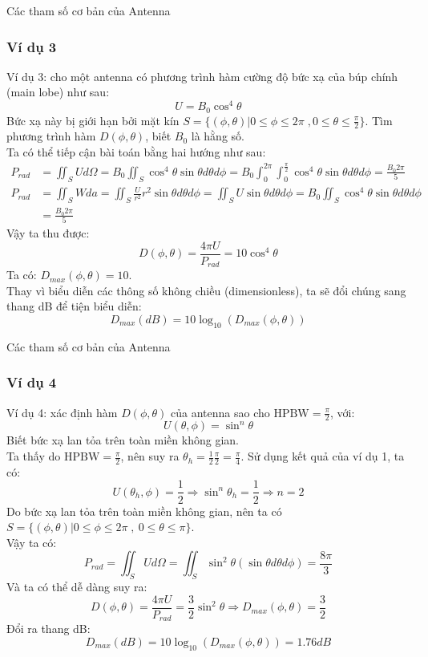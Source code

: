 \documentclass[8pt]{beamer}
\begin{document}
\begin{frame}{Các tham số cơ bản của Antenna}
\subsubsection{Ví dụ 3}
Ví dụ 3: cho một antenna có phương trình hàm cường độ bức xạ của búp chính (main lobe) như sau:
$$U=B_{0}\cos^4{\theta}$$
Bức xạ này bị giới hạn bởi mặt kín $S=\{(\phi,\theta)|0\leq\phi\leq 2\pi\; ,0\leq\theta\leq\frac{\pi}{2}\}$. Tìm phương trình hàm $D(\phi,\theta)$, biết $B_{0}$ là hằng số.
\\ Ta có thể tiếp cận bài toán bằng hai hướng như sau:
\begin{equation*}
\begin{split}
	P_{rad}&=\iint_{S}Ud\Omega=B_{0}\iint_{S}\cos^4{\theta}\sin{\theta}d\theta d\phi=B_{0}\int_{0}^{2\pi}\int_{0}^{\frac{\pi}{2}}\cos^4{\theta}\sin{\theta}d\theta d\phi=\frac{B_{0}2\pi}{5}\\
	P_{rad}&=\iint_{S}Wda=\iint_{S}\frac{U}{r^2}r^2\sin{\theta}d\theta d\phi=\iint_{S}U\sin{\theta}d\theta d\phi=B_{0}\iint_{S}\cos^4{\theta}\sin{\theta}d\theta d\phi\\&=\frac{B_{0}2\pi}{5}
\end{split}
\end{equation*}
Vậy ta thu được:
$$D(\phi,\theta)=\frac{4\pi U}{P_{rad}}=10\cos^4{\theta}$$
Ta có: $D_{max}(\phi,\theta)=10$.
\\\alert{Thay vì biểu diễn các thông số không chiều (dimensionless), ta sẽ đổi chúng sang thang dB để tiện biểu diễn:}
$$D_{max}(dB)=10\log_{10}(D_{max}(\phi,\theta))$$
\end{frame}
\begin{frame}{Các tham số cơ bản của Antenna}
\subsubsection{Ví dụ 4}
Ví dụ 4: xác định hàm $D(\phi,\theta)$ của antenna sao cho $\text{HPBW}=\frac{\pi}{2}$, với:
$$U(\theta,\phi)=\sin^n{\theta}$$
Biết bức xạ lan tỏa trên toàn miền không gian.
\\ Ta thấy do $\text{HPBW}=\frac{\pi}{2}$, nên suy ra $\theta_{h}=\frac{1}{2}\frac{\pi}{2}=\frac{\pi}{4}$. Sử dụng kết quả của ví dụ 1, ta có:
$$U(\theta_{h},\phi)=\frac{1}{2}\Rightarrow \sin^n{\theta_{h}}=\frac{1}{2}\Rightarrow n=2$$
Do bức xạ lan tỏa trên toàn miền không gian, nên ta có $S=\{(\phi,\theta)|0\leq\phi\leq 2\pi\;, \ 0\leq\theta\leq\pi\}$.
\\ Vậy ta có:
$$P_{rad}=\iint_{S}Ud\Omega=\iint_{S}\sin^2{\theta}(\sin{\theta}d\theta d\phi)=\frac{8\pi}{3}$$
Và ta có thể dễ dàng suy ra:
$$D(\phi,\theta)=\frac{4\pi U}{P_{rad}}=\frac{3}{2}\sin^2{\theta}\Rightarrow D_{max}{(\phi,\theta)}=\frac{3}{2}$$
Đổi ra thang dB: $$D_{max}(dB)=10\log_{10}(D_{max}(\phi,\theta))=1.76dB$$
\end{frame}
\end{document}
